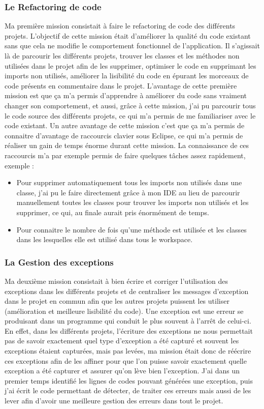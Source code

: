 \documentclass[12pt,a4paper]{report}
\begin{document}
\subsubsection{Le Refactoring de code}
Ma première mission consistait à faire le refactoring de code des différents projets. L'objectif de cette mission était d'améliorer la qualité du code existant sans que cela ne modifie le comportement fonctionnel de l'application. Il s'agissait là de parcourir les différents projets, trouver les classes et les méthodes non utilisées dans le projet afin de les supprimer, optimiser le code en supprimant les imports non utilisés, améliorer la lisibilité du code en épurant les  morceaux de code présents en commentaire dans le projet.\newline
L'avantage de cette première mission est que ça m'a permis d'apprendre à améliorer du code sans vraiment changer son comportement, et aussi, grâce à cette mission, j'ai pu parcourir tous le code source des différents projets, ce qui m'a permis de me familiariser avec le code existant.
Un autre avantage de cette mission c'est que ça m'a permis de connaitre d'avantage de raccourcis clavier sous Eclipse, ce qui m'a permis de réaliser un gain de temps énorme durant cette mission.\vspace{0.3cm}\newline
La connaissance de ces raccourcis m'a par exemple permis de faire quelques tâches assez rapidement, exemple :
\begin{itemize}
\item Pour supprimer automatiquement tous les imports non utilisés dans une classe, j'ai pu le faire directement grâce à mon IDE au lieu de parcourir manuellement toutes les classes pour trouver les imports non utilisés et les supprimer, ce qui, au finale aurait pris énormément de temps.
\item Pour connaitre le nombre de fois qu'une méthode est utilisée et les classes dans les lesquelles elle est utilisé dans tous le workspace. 
\end{itemize}
\subsubsection{La Gestion des exceptions}
Ma deuxième mission consistait à bien écrire et  corriger l'utilisation des exceptions dans les différents projets et de centraliser les messages d'exception dans le projet en commun afin que les autres projets puissent les utiliser (amélioration et meilleure lisibilité du code). Une exception est une erreur se produisant dans un programme qui conduit le plus souvent à l'arrêt de celui-ci. En effet, dans les différents projets, l'écriture des exceptions ne nous permettait pas de savoir exactement quel type d'exception a été capturé et souvent les exceptions étaient capturées, mais pas levées, ma mission était donc de réécrire ces exceptions afin de les affiner pour que l'on puisse savoir exactement quelle exception a été capturer et assurer qu'on lève bien  l'exception. J'ai dans un premier temps identifié les lignes de codes pouvant générées une exception, puis j'ai écrit le code permettant de détecter, de traiter ces erreurs mais aussi de les lever afin d'avoir une meilleure gestion des erreurs dans tout le projet.  
\end{document}
